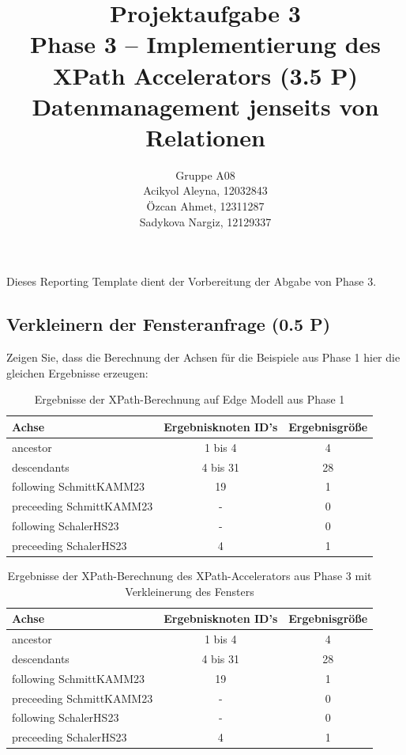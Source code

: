 \documentclass[11pt]{scrartcl}
\title{
  \textbf{\large Projektaufgabe 3 } \\
  Phase 3 – Implementierung des XPath Accelerators (3.5 P) \\
  {\large Datenmanagement jenseits von Relationen}
}
\author{
  Gruppe A08 \\
  \large Acikyol Aleyna, 12032843 \\
  \large Özcan Ahmet, 12311287 \\
  \large Sadykova Nargiz, 12129337
}
\begin{document}
\maketitle\thispagestyle{empty}

Dieses Reporting Template dient der Vorbereitung der Abgabe von Phase 3.

\subsection*{Verkleinern der Fensteranfrage (0.5 P)}

Zeigen Sie, dass die Berechnung der Achsen für die Beispiele aus Phase 1 hier die gleichen Ergebnisse erzeugen:

\begin{table}[h]
	\centering
		\begin{center}
			\begin{tabular}{ l | c c }
				\toprule
				Achse & Ergebnisknoten ID's & Ergebnisgröße\\
				\midrule
				ancestor & 1 bis 4 & 4 \\
				descendants & 4 bis 31 & 28 \\
				following SchmittKAMM23& 19 & 1 \\
				preceeding SchmittKAMM23 & - & 0 \\
				following SchalerHS23& - & 0 \\
				preceeding SchalerHS23& 4 & 1 \\
				\bottomrule
			\end{tabular}
			\end{center}
	\caption{Ergebnisse der XPath-Berechnung auf Edge Modell aus Phase 1}
	\label{tab:ErgebnisseDerXPathBerechnug}
\end{table}

\begin{table}[h]
	\centering
		\begin{center}
			\begin{tabular}{ l | c c }
				\toprule
				Achse & Ergebnisknoten ID's & Ergebnisgröße\\
				\midrule
				ancestor & 1 bis 4 & 4 \\
				descendants & 4 bis 31 & 28 \\
				following SchmittKAMM23& 19 & 1 \\
				preceeding SchmittKAMM23 & - & 0 \\
				following SchalerHS23& - & 0 \\
				preceeding SchalerHS23& 4 & 1 \\
				\bottomrule
			\end{tabular}
			\end{center}
	\caption{Ergebnisse der XPath-Berechnung des XPath-Accelerators aus Phase 3 mit Verkleinerung des Fensters}
	\label{tab:ErgebnisseDerXPathBerechnug}
\end{table}
\end{document}
